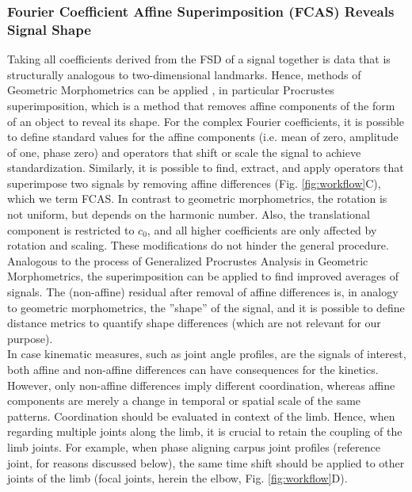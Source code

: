 \documentclass[10pt, a4paper]{article}
\begin{document}
\begin{linenumbers}[1]
\subsubsection*{Fourier Coefficient Affine Superimposition (FCAS) Reveals Signal Shape}
Taking all coefficients derived from the FSD of a signal together is data that is structurally analogous to two-dimensional landmarks. 
Hence, methods of Geometric Morphometrics can be applied \citep{Bookstein1991,Kendall1989,Gower1975,Dryden2016}, in particular Procrustes superimposition, which is a method that removes affine components of the form of an object to reveal its shape. 
For the complex Fourier coefficients, it is possible to define standard values for the affine components (i.e. mean of zero, amplitude of one, phase zero) and operators that shift or scale the signal to achieve standardization. 
Similarly, it is possible to find, extract, and apply operators that superimpose two signals by removing affine differences (Fig. \ref{fig:workflow}C), which we term FCAS. 
In contrast to geometric morphometrics, the rotation is not uniform, but depends on the harmonic number. 
Also, the translational component is restricted to $c_{0}$, and all higher coefficients are only affected by rotation and scaling. 
These modifications do not hinder the general procedure. 
Analogous to the process of Generalized Procrustes Analysis in Geometric Morphometrics, the superimposition can be applied to find improved averages of signals. 
The (non-affine) residual after removal of affine differences is, in analogy to geometric morphometrics, the ''shape'' of the signal, and it is possible to define distance metrics to quantify shape differences (which are not relevant for our purpose). 
\\In case kinematic measures, such as joint angle profiles, are the signals of interest, both affine and non-affine differences can have consequences for the kinetics. 
However, only non-affine differences imply different coordination, whereas affine components are merely a change in temporal or spatial scale of the same patterns. 
Coordination should be evaluated in context of the limb. 
Hence, when regarding multiple joints along the limb, it is crucial to retain the coupling of the limb joints. 
For example, when phase aligning carpus joint profiles (reference joint, for reasons discussed below), the same time shift should be applied to other joints of the limb (focal joints, herein the elbow, Fig. \ref{fig:workflow}D). 

\end{linenumbers}
\end{document}
